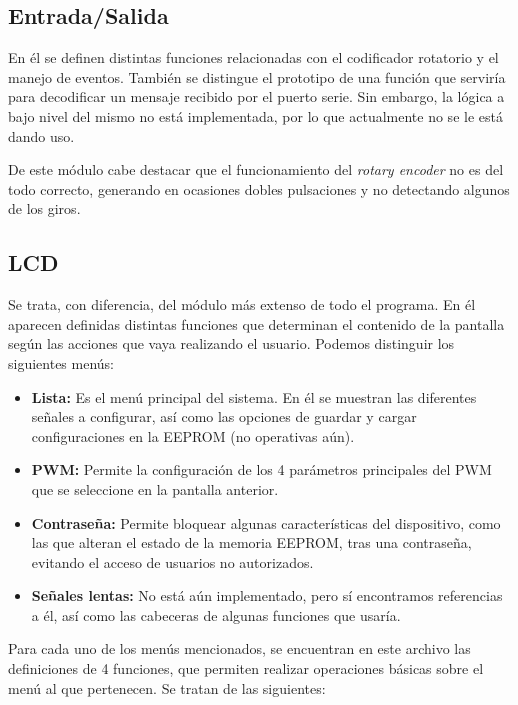 \subsection{Entrada/Salida}


En él se definen distintas funciones relacionadas con el codificador rotatorio y el manejo de eventos. También se distingue el prototipo de una función que serviría para decodificar un mensaje recibido por el puerto serie. Sin embargo, la lógica a bajo nivel del mismo no está implementada, por lo que actualmente no se le está dando uso.

De este módulo cabe destacar que el funcionamiento del \textit{rotary encoder} no es del todo correcto, generando en ocasiones dobles pulsaciones y no detectando algunos de los giros.

\subsection{LCD}

Se trata, con diferencia, del módulo más extenso de todo el programa. En él aparecen definidas distintas funciones que determinan el contenido de la pantalla según las acciones que vaya realizando el usuario. Podemos distinguir los siguientes menús:

\begin{itemize}
    \item\textbf{Lista:} Es el menú principal del sistema. En él se muestran las diferentes señales a configurar, así como las opciones de guardar y cargar configuraciones en la EEPROM (no operativas aún).
    \item\textbf{PWM:} Permite la configuración de los 4 parámetros principales del PWM que se seleccione en la pantalla anterior.
    \item\textbf{Contraseña:} Permite bloquear algunas características del dispositivo, como las que alteran el estado de la memoria EEPROM, tras una contraseña, evitando el acceso de usuarios no autorizados.
    \item\textbf{Señales lentas:} No está aún implementado, pero sí encontramos referencias a él, así como las cabeceras de algunas funciones que usaría.
\end{itemize}

Para cada uno de los menús mencionados, se encuentran en este archivo las definiciones de 4 funciones, que permiten realizar operaciones básicas sobre el menú al que pertenecen. Se tratan de las siguientes:


